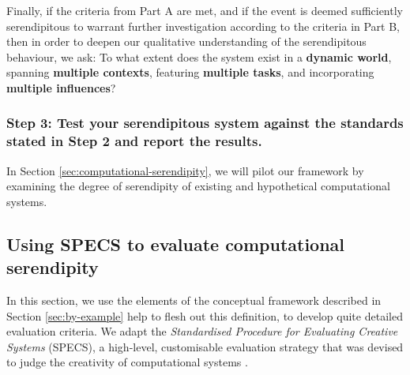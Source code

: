\begin{description}[itemsep=16pt]
\item[{(\textbf{C - Factors})}] {Finally, if the criteria from Part A
  are met, and if the event is deemed sufficiently serendipitous to
  warrant further investigation according to the criteria in Part B,
  then in order to deepen our qualitative understanding of the
  serendipitous behaviour, we ask: To what extent does the system
  exist in a {\textbf{dynamic world}}, spanning {\textbf{multiple
      contexts}}, featuring {\textbf{multiple tasks}}, and
  incorporating {\textbf{multiple influences}}?}
\end{description}

\subsubsection*{Step 3: Test your serendipitous system against the standards stated in Step 2 and report the results.}

\noindent In Section \ref{sec:computational-serendipity}, we will pilot our framework by examining the degree of serendipity of existing and hypothetical computational systems. 

\subsection{Using SPECS to evaluate computational serendipity}\label{specs-overview}

In this section, we use the elements of the conceptual framework
described in Section \ref{sec:by-example} help to flesh out this
definition, to develop quite detailed evaluation criteria.
We adapt the \emph{Standardised Procedure for Evaluating Creative Systems} (SPECS),
a high-level, customisable evaluation strategy that was devised to judge the creativity
of computational systems \cite{jordanous:12}.  


